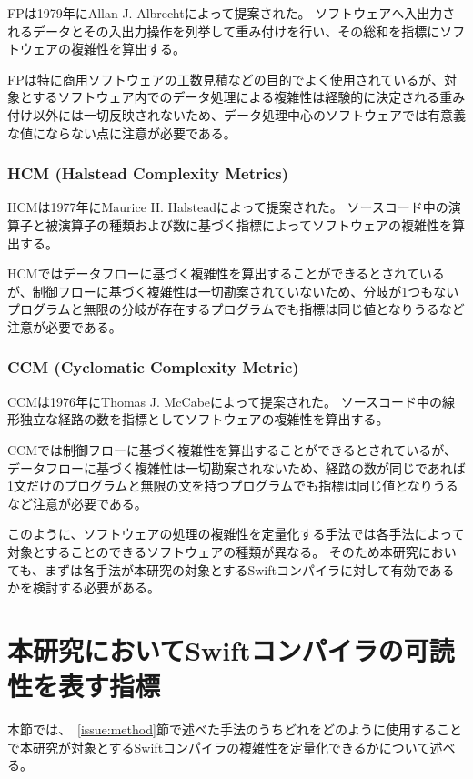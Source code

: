 FPは1979年にAllan J. Albrechtによって提案された。
ソフトウェアへ入出力されるデータとその入出力操作を列挙して重み付けを行い、その総和を指標にソフトウェアの複雑性を算出する。

FPは特に商用ソフトウェアの工数見積などの目的でよく使用されているが、対象とするソフトウェア内でのデータ処理による複雑性は経験的に決定される重み付け以外には一切反映されないため、データ処理中心のソフトウェアでは有意義な値にならない点に注意が必要である。

\subsubsection{HCM (Halstead Complexity Metrics)}

HCMは1977年にMaurice H. Halsteadによって提案された。
ソースコード中の演算子と被演算子の種類および数に基づく指標によってソフトウェアの複雑性を算出する。

HCMではデータフローに基づく複雑性を算出することができるとされているが、制御フローに基づく複雑性は一切勘案されていないため、分岐が1つもないプログラムと無限の分岐が存在するプログラムでも指標は同じ値となりうるなど注意が必要である。

\subsubsection{CCM (Cyclomatic Complexity Metric)}

CCMは1976年にThomas J. McCabeによって提案された。
ソースコード中の線形独立な経路の数を指標としてソフトウェアの複雑性を算出する。

CCMでは制御フローに基づく複雑性を算出することができるとされているが、データフローに基づく複雑性は一切勘案されないため、経路の数が同じであれば1文だけのプログラムと無限の文を持つプログラムでも指標は同じ値となりうるなど注意が必要である。

\vspace{2em}

このように、ソフトウェアの処理の複雑性を定量化する手法では各手法によって対象とすることのできるソフトウェアの種類が異なる。
そのため本研究においても、まずは各手法が本研究の対象とするSwiftコンパイラに対して有効であるかを検討する必要がある。


\section{本研究においてSwiftコンパイラの可読性を表す指標}
\label{issue:barometer}

本節では、~\ref{issue:method}節で述べた手法のうちどれをどのように使用することで本研究が対象とするSwiftコンパイラの複雑性を定量化できるかについて述べる。

